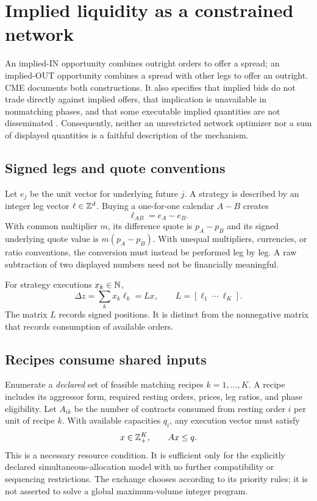 \section{Implied liquidity as a constrained network}
\label{sec:implied}

An implied-IN opportunity combines outright orders to offer a spread; an implied-OUT opportunity combines a spread with other legs to offer an outright. CME documents both constructions. It also specifies that implied bids do not trade directly against implied offers, that implication is unavailable in nonmatching phases, and that some executable implied quantities are not disseminated \citep{CMEImplied}. Consequently, neither an unrestricted network optimizer nor a sum of displayed quantities is a faithful description of the mechanism.

\subsection{Signed legs and quote conventions}

Let $e_j$ be the unit vector for underlying future $j$. A strategy is described by an integer leg vector $\ell\in\mathbb Z^d$. Buying a one-for-one calendar $A-B$ creates
\begin{equation}
 \ell_{AB}=e_A-e_B.
\end{equation}
With common multiplier $m$, its difference quote is $p_A-p_B$ and its signed underlying quote value is $m(p_A-p_B)$. With unequal multipliers, currencies, or ratio conventions, the conversion must instead be performed leg by leg. A raw subtraction of two displayed numbers need not be financially meaningful.

For strategy executions $x_k\in\mathbb N$,
\begin{equation}
 \Delta z=\sum_kx_k\ell_k=Lx,
 \qquad L=[\ell_1\ \cdots\ \ell_K].
\label{eq:legs}
\end{equation}
The matrix $L$ records signed positions. It is distinct from the nonnegative matrix that records consumption of available orders.

\subsection{Recipes consume shared inputs}

Enumerate a \emph{declared} set of feasible matching recipes $k=1,\ldots,K$. A recipe includes its aggressor form, required resting orders, prices, leg ratios, and phase eligibility. Let $A_{ik}$ be the number of contracts consumed from resting order $i$ per unit of recipe $k$. With available capacities $q_i$, any execution vector must satisfy
\begin{equation}
 x\in\mathbb Z_+^K,\qquad Ax\le q.
\label{eq:resources}
\end{equation}
This is a necessary resource condition. It is sufficient only for the explicitly declared simultaneous-allocation model with no further compatibility or sequencing restrictions. The exchange chooses according to its priority rules; it is not asserted to solve a global maximum-volume integer program.

